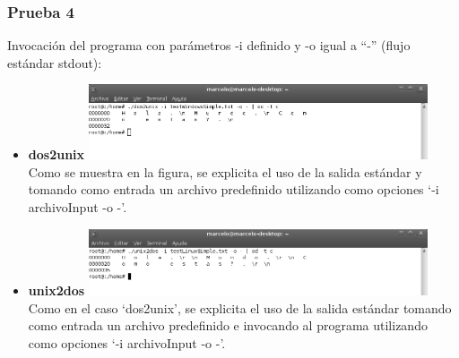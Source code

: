 \documentclass[a4paper,10pt]{article}
\begin{document}
    \subsubsection{Prueba 4}
    Invocaci\'on del programa con par\'ametros -i definido y -o igual a ``-'' (flujo est\'andar stdout):
      \begin{itemize}
      \item \textbf{dos2unix}
      \newline
      \includegraphics[width=10cm, viewport=0 0 897 199]{../Informe/Imagenes/prueba4-invocacion-dos2unix.png}
      \newline	
      Como se muestra en la figura, se explicita el uso de la salida est\'andar y tomando como entrada un archivo predefinido utilizando como opciones 
      `-i archivoInput -o -'.
      \item \textbf{unix2dos}
      \newline
      \includegraphics[width=10cm, viewport=0 0 898 177]{../Informe/Imagenes/prueba4-invocacion-unix2dos.png}	
      \newline
      Como en el caso `dos2unix', se explicita el uso de la salida est\'andar tomando como entrada un archivo predefinido e invocando al programa
      utilizando como opciones `-i archivoInput -o -'.
      
      \end{itemize}
\end{document}
